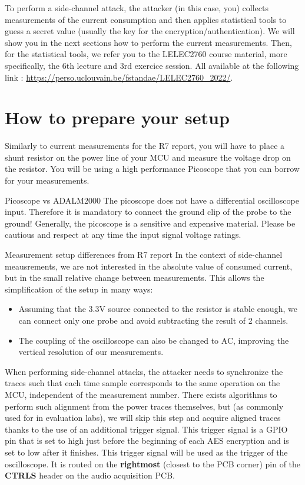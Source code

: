 To perform a side-channel attack, the attacker (in this case, you) collects measurements of the current consumption and then applies statistical tools to guess a secret value (usually the key for the encryption/authentication). We will show you in the next sections how to perform the current measurements. Then, for the statistical tools, we refer you to the LELEC2760 course material, more specifically, the 6th lecture and 3rd exercice session. All available at the following link : \url{https://perso.uclouvain.be/fstandae/LELEC2760_2022/}. \\

\section{How to prepare your setup}
Similarly to current measurements for the R7 report, you will have to place a shunt resistor on the power line of your MCU and measure the voltage drop on the resistor. You will be using a high performance Picoscope that you can borrow for your measurements.
\begin{bclogo}[couleur = gray!20, arrondi = 0.2, logo=\bcattention]{Picoscope vs ADALM2000}
The picoscope does not have a differential oscilloscope input. Therefore it is mandatory to connect the ground clip of the probe to the ground! Generally, the picoscope is a sensitive and expensive material. Please be cautious and respect at any time the input signal voltage ratings.
\end{bclogo}

\begin{bclogo}[couleur = gray!20, arrondi = 0.2, logo=\bcinfo]{Measurement setup differences from R7 report}
In the context of side-channel meausrements, we are not interested in the absolute value of consumed current, but in the small relative change between measurements. This allows the simplification of the setup in many ways:
\begin{itemize}
    \item Assuming that the 3.3V source connected to the resistor is stable enough, we can connect only one probe and avoid subtracting the result of 2 channels.
    \item The coupling of the oscilloscope can also be changed to AC, improving the vertical resolution of our measurements.
\end{itemize}
\end{bclogo}
When performing side-channel attacks, the attacker needs to synchronize the traces such that each time sample corresponds to the same operation on the MCU, independent of the measurement number. There exists algorithms to perform such alignment from the power traces themselves, but (as commonly used for in evaluation labs), we will skip this step and acquire aligned traces thanks to the use of an additional trigger signal. This trigger signal is a GPIO pin that is set to high just before the beginning of each AES encryption and is set to low after it finishes. This trigger signal will be used as the trigger of the oscilloscope. It is routed on the \textbf{rightmost} (closest to the PCB corner) pin of the \textbf{CTRLS} header on the audio acquisition PCB.

